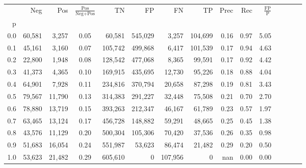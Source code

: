 \begin{tabular}{rrrcrrrrrrrrrrr}
\toprule
{} &     Neg &     Pos & $\frac{\text{Pos}}{\text{Neg}+\text{Pos}}$ &       TN &       FP &       FN &       TP &  Prec &   Rec & $\frac{\text{FP}}{\text{P}}$ \\
p   &         &         &                                            &          &          &          &          &       &       &                              \\
\midrule
0.0 &  60,581 &   3,257 &                                       0.05 &   60,581 &  545,029 &    3,257 &  104,699 &  0.16 &  0.97 &                         5.05 \\
0.1 &  45,161 &   3,160 &                                       0.07 &  105,742 &  499,868 &    6,417 &  101,539 &  0.17 &  0.94 &                         4.63 \\
0.2 &  22,800 &   1,948 &                                       0.08 &  128,542 &  477,068 &    8,365 &   99,591 &  0.17 &  0.92 &                         4.42 \\
0.3 &  41,373 &   4,365 &                                       0.10 &  169,915 &  435,695 &   12,730 &   95,226 &  0.18 &  0.88 &                         4.04 \\
0.4 &  64,901 &   7,928 &                                       0.11 &  234,816 &  370,794 &   20,658 &   87,298 &  0.19 &  0.81 &                         3.43 \\
0.5 &  79,567 &  11,790 &                                       0.13 &  314,383 &  291,227 &   32,448 &   75,508 &  0.21 &  0.70 &                         2.70 \\
0.6 &  78,880 &  13,719 &                                       0.15 &  393,263 &  212,347 &   46,167 &   61,789 &  0.23 &  0.57 &                         1.97 \\
0.7 &  63,465 &  13,124 &                                       0.17 &  456,728 &  148,882 &   59,291 &   48,665 &  0.25 &  0.45 &                         1.38 \\
0.8 &  43,576 &  11,129 &                                       0.20 &  500,304 &  105,306 &   70,420 &   37,536 &  0.26 &  0.35 &                         0.98 \\
0.9 &  51,683 &  16,054 &                                       0.24 &  551,987 &   53,623 &   86,474 &   21,482 &  0.29 &  0.20 &                         0.50 \\
1.0 &  53,623 &  21,482 &                                       0.29 &  605,610 &        0 &  107,956 &        0 &   nan &  0.00 &                         0.00 \\
\bottomrule
\end{tabular}

